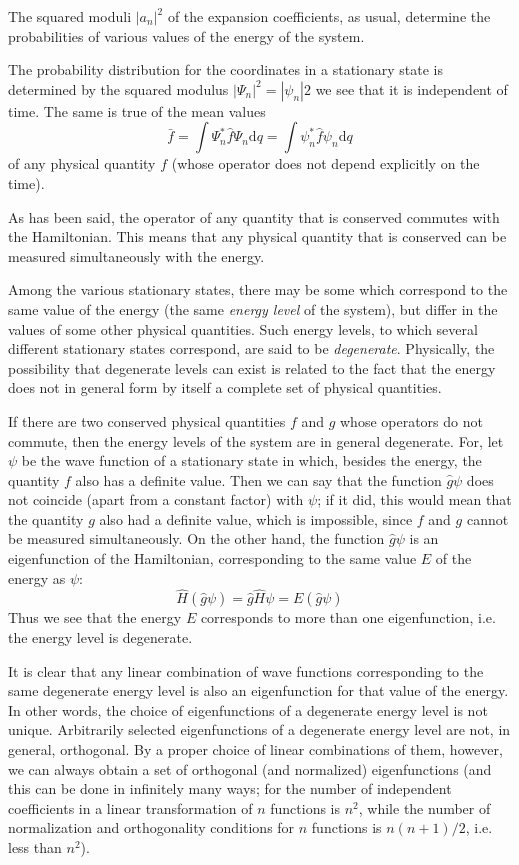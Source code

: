 The squared moduli $ |a_n|^2 $ of the expansion coefficients, as usual, determine the probabilities of various values of the energy of the system.

The probability distribution for the coordinates in a stationary state is determined by the squared modulus $ |\Psi_n|^2 = |\psi_n|2 $ we see that it is independent of time. The same is true of the mean values
\[ \bar{f}=\int\Psi_n^*\hat{f}\Psi_n\mathrm{d}q=\int\psi_n^*\hat{f}\psi_n\mathrm{d}q \]
of any physical quantity $ f $ (whose operator does not depend explicitly on the time).

As has been said, the operator of any quantity that is conserved commutes with the Hamiltonian. This means that any physical quantity that is conserved can be measured simultaneously with the energy.

Among the various stationary states, there may be some which correspond to the same value of the energy (the same \textit{energy level} of the system), but differ in the values of some other physical quantities. Such energy levels, to which several different stationary states correspond, are said to be \textit{degenerate}. Physically, the possibility that degenerate levels can exist is related to the fact that the energy does not in general form by itself a complete set of physical quantities.

If there are two conserved physical quantities $ f $ and $ g $ whose operators do not commute, then the energy levels of the system are in general degenerate. For, let $ \psi $ be the wave function of a stationary state in which, besides the energy, the quantity $ f $ also has a definite value. Then we can say that the function $ \hat{g}\psi $ does not coincide (apart from a constant factor) with $ \psi $; if it did, this would mean that the quantity $ g $ also had a definite value, which is impossible, since $ f $ and $ g $ cannot be measured simultaneously. On the other hand, the function $ \hat{g}\psi $ is an eigenfunction of the Hamiltonian, corresponding to the same value $ E $ of the energy as $\psi$:
\[ \hat{H}(\hat{g}\psi)=\hat{g}\hat{H}\psi=E(\hat{g}\psi) \]
Thus we see that the energy $ E $ corresponds to more than one eigenfunction, i.e. the energy level is degenerate.

It is clear that any linear combination of wave functions corresponding to the same degenerate energy level is also an eigenfunction for that value of the energy. In other words, the choice of eigenfunctions of a degenerate energy level is not unique. Arbitrarily selected eigenfunctions of a degenerate energy level are not, in general, orthogonal. By a proper choice of linear combinations of them, however, we can always obtain a set of orthogonal (and normalized) eigenfunctions (and this can be done in infinitely many ways; for the number of independent coefficients in a linear transformation of $ n $ functions is $ n^2 $, while the number of normalization and orthogonality conditions for $ n $ functions is $  n(n+1)/2 $, i.e. less than $ n^2 $).

